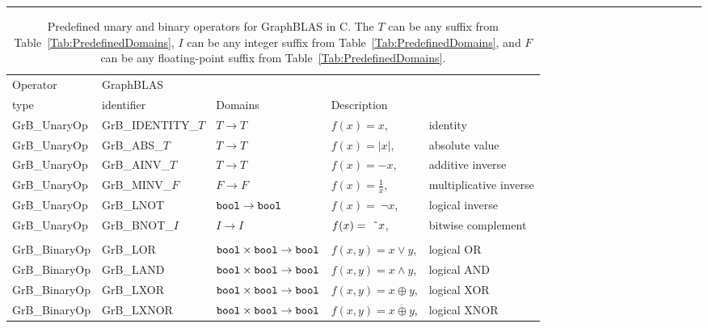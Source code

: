 \begin{table}
\hspace*{-2.5em}\begin{threeparttable}
\hrule
\caption[Predefined unary and binary operators for GraphBLAS in C.]{Predefined unary and binary operators for GraphBLAS in C.  The $T$ can 
be any suffix from Table~\ref{Tab:PredefinedDomains}, $I$ can be any integer 
suffix from Table~\ref{Tab:PredefinedDomains}, and $F$ can be any floating-point suffix from Table~\ref{Tab:PredefinedDomains}.}
\label{Tab:PredefOperators}
\vspace{1\baselineskip}

\begin{tabular}{l|l|l|ll}
Operator & GraphBLAS             &                                                              & \\
type     & identifier            & Domains                                              & Description \\ \hline
{\sf GrB\_UnaryOp}    & {\sf GrB\_IDENTITY\_$T$} & $T \rightarrow T $     & $f(x) = x$, &identity \\
{\sf GrB\_UnaryOp}    & {\sf GrB\_ABS\_$T$}      & $T \rightarrow T $     & $f(x) = |x|$, &absolute value \\
{\sf GrB\_UnaryOp}    & {\sf GrB\_AINV\_$T$}     & $T \rightarrow T $     & $f(x) = -x$, &additive inverse \\
{\sf GrB\_UnaryOp}    & {\sf GrB\_MINV\_$F$}     & $F \rightarrow F $     & $f(x) = \frac{1}{x}$, &multiplicative inverse \\
{\sf GrB\_UnaryOp}    & {\sf GrB\_LNOT}          & ${\tt bool} \rightarrow {\tt bool}$  & $f(x) =~\neg x$, &logical inverse  \\
{\sf GrB\_UnaryOp}    & {\sf GrB\_BNOT\_$I$}     & $I \rightarrow I$      & $f(x) =~\mbox{\~{}} x$, &bitwise complement \\

&&&\\
{\sf GrB\_BinaryOp}   & {\sf GrB\_LOR}        & ${\tt bool} \times {\tt bool} \rightarrow {\tt bool}$ & $f(x,y) = x \lor y$, & logical OR \\
{\sf GrB\_BinaryOp}   & {\sf GrB\_LAND}       & ${\tt bool} \times {\tt bool} \rightarrow {\tt bool}$ & $f(x,y) = x \land y$, & logical AND \\
{\sf GrB\_BinaryOp}   & {\sf GrB\_LXOR}       & ${\tt bool} \times {\tt bool} \rightarrow {\tt bool}$ & $f(x,y) = x \oplus y$, & logical XOR \\
{\sf GrB\_BinaryOp}   & {\sf GrB\_LXNOR}      & ${\tt bool} \times {\tt bool} \rightarrow {\tt bool}$ & $f(x,y) = \overline{x \oplus y}$, & logical XNOR \\


\end{tabular}
\end{threeparttable}
\end{table}
